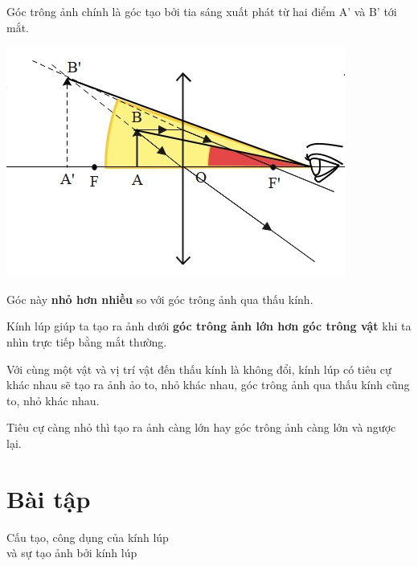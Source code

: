 Góc trông ảnh chính là góc tạo bởi tia sáng xuất phát từ hai điểm A’ và B’ tới mắt. 
\begin{center}
	\includegraphics[scale=0.8]{../figs/VN11-PH-41-L-029-1-h45.jpg}
\end{center}

Góc này \textbf{nhỏ hơn nhiều} so với góc trông ảnh qua thấu kính.

Kính lúp giúp ta tạo ra ảnh dưới \textbf{góc trông ảnh lớn hơn góc trông vật} khi ta nhìn trực tiếp bằng mắt thường.

Với cùng một vật và vị trí vật đến thấu kính là không đổi, kính lúp có tiêu cự khác nhau sẽ tạo ra ảnh ảo to, nhỏ khác nhau,  góc trông ảnh qua thấu kính cũng to, nhỏ khác nhau. 

Tiêu cự càng nhỏ thì tạo ra ảnh càng lớn hay góc trông ảnh càng lớn và ngược lại.


\section{Bài tập}
\begin{dang}{Cấu tạo, công dụng của kính lúp \\và sự tạo ảnh bởi kính lúp}
\end{dang}

